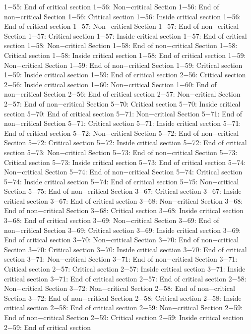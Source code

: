 1−55: End of critical section
1−56: Non−critical Section
1−56: End of non−critical Section
1−56: Critical section
1−56: Inside critical section
1−56: End of critical section
1−57: Non−critical Section
1−57: End of non−critical Section
1−57: Critical section
1−57: Inside critical section
1−57: End of critical section
1−58: Non−critical Section
1−58: End of non−critical Section
1−58: Critical section
1−58: Inside critical section
1−58: End of critical section
1−59: Non−critical Section
1−59: End of non−critical Section
1−59: Critical section
1−59: Inside critical section
1−59: End of critical section
2−56: Critical section
2−56: Inside critical section
1−60: Non−critical Section
1−60: End of non−critical Section
2−56: End of critical section
2−57: Non−critical Section
2−57: End of non−critical Section
5−70: Critical section
5−70: Inside critical section
5−70: End of critical section
5−71: Non−critical Section
5−71: End of non−critical Section
5−71: Critical section
5−71: Inside critical section
5−71: End of critical section
5−72: Non−critical Section
5−72: End of non−critical Section
5−72: Critical section
5−72: Inside critical section
5−72: End of critical section
5−73: Non−critical Section
5−73: End of non−critical Section
5−73: Critical section
5−73: Inside critical section
5−73: End of critical section
5−74: Non−critical Section
5−74: End of non−critical Section
5−74: Critical section
5−74: Inside critical section
5−74: End of critical section
5−75: Non−critical Section
5−75: End of non−critical Section
3−67: Critical section
3−67: Inside critical section
3−67: End of critical section
3−68: Non−critical Section
3−68: End of non−critical Section
3−68: Critical section
3−68: Inside critical section
3−68: End of critical section
3−69: Non−critical Section
3−69: End of non−critical Section
3−69: Critical section
3−69: Inside critical section
3−69: End of critical section
3−70: Non−critical Section
3−70: End of non−critical Section
3−70: Critical section
3−70: Inside critical section
3−70: End of critical section
3−71: Non−critical Section
3−71: End of non−critical Section
3−71: Critical section
2−57: Critical section
2−57: Inside critical section
3−71: Inside critical section
3−71: End of critical section
2−57: End of critical section
2−58: Non−critical Section
3−72: Non−critical Section
2−58: End of non−critical Section
3−72: End of non−critical Section
2−58: Critical section
2−58: Inside critical section
2−58: End of critical section
2−59: Non−critical Section
2−59: End of non−critical Section
2−59: Critical section
2−59: Inside critical section
2−59: End of critical section
